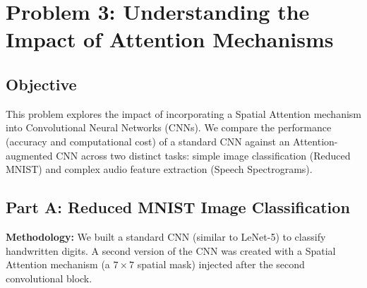 \section{Problem 3: Understanding the Impact of Attention Mechanisms}

\vspace{-0.5em} %
\subsection{Objective}
This problem explores the impact of incorporating a Spatial Attention mechanism into Convolutional Neural Networks (CNNs). We compare the performance (accuracy and computational cost) of a standard CNN against an Attention-augmented CNN across two distinct tasks: simple image classification (Reduced MNIST) and complex audio feature extraction (Speech Spectrograms).

\vspace{-0.5em}
\subsection{Part A: Reduced MNIST Image Classification}

\textbf{Methodology:} 
We built a standard CNN (similar to LeNet-5) to classify handwritten digits. A second version of the CNN was created with a Spatial Attention mechanism (a $7\times7$ spatial mask) injected after the second convolutional block.

